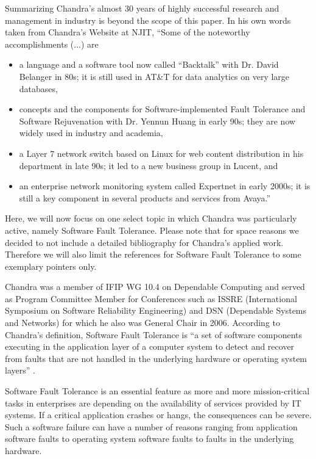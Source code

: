 \documentclass[copyright]{eptcs}
\begin{document}
Summarizing Chandra's almost 30 years of highly successful research and
management in industry is beyond the scope of this paper.
In his own words taken from Chandra's Website at
NJIT, ``Some of the noteworthy accomplishments (...) are

\begin{itemize}

\item a language and a software tool now called ``Backtalk'' with Dr.
David Belanger in 80s; it is still used in AT\&T for data analytics on
very large databases,

\item concepts and the components for Software-implemented Fault
Tolerance and Software Rejuvenation with Dr. Yennun Huang in early 90s;
 they are now widely used in industry and academia,

\item a Layer 7 network switch based on Linux for web content
distribution in his department in late 90s; it led to a new business
group in Lucent, and

\item an enterprise network monitoring system called Expertnet in early
2000s; it is still a key component in several products and services from
Avaya.''
\end{itemize}

Here, we will now focus on one select topic in which Chandra was
particularly active, namely Software Fault Tolerance. Please note that
for space reasons we decided to not include a detailed bibliography for
Chandra's applied work. Therefore we will also limit the references
for Software Fault Tolerance to some exemplary pointers only. 

Chandra was a
member of IFIP WG 10.4 on Dependable Computing and served as Program
Committee Member for Conferences such as ISSRE (International Symposium on
Software Reliability Engineering) and DSN (Dependable Systems and
Networks) for which he also was General Chair in 2006.  According to
Chandra's definition, Software Fault Tolerance is ``a set of software
components executing in the application layer of a computer system to
detect and recover from faults that are not handled in the underlying
hardware or operating system layers'' \cite{HuangK96}.

Software Fault Tolerance is an essential feature as more and more mission-critical 
tasks in enterprises are depending on the availability of services provided 
by IT systems. If a critical
application crashes or hangs, the consequences can be severe. Such a
software failure can have a number of reasons ranging from application
software faults to operating system software faults to faults in the
underlying hardware.
\end{document}
